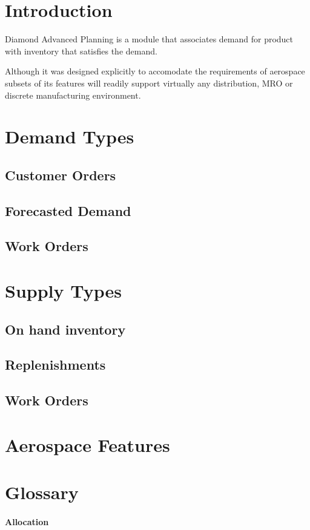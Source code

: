 \documentclass[a4paper,10pt]{book}
\begin{document}
\section{Introduction}
Diamond Advanced Planning is a module that associates demand for product with inventory that satisfies the demand.

Although it was designed explicitly to accomodate the requirements of aerospace subsets of its 
features will readily support virtually any distribution, MRO or discrete manufacturing environment.

\section{Demand Types}
\subsection{Customer Orders}
\subsection{Forecasted Demand}
\subsection{Work Orders}

\section{Supply Types}
\subsection{On hand inventory}
\subsection{Replenishments} 
\subsection{Work Orders}

\section{Aerospace Features}
\section{Glossary}
\paragraph{Allocation}
\end{document}
